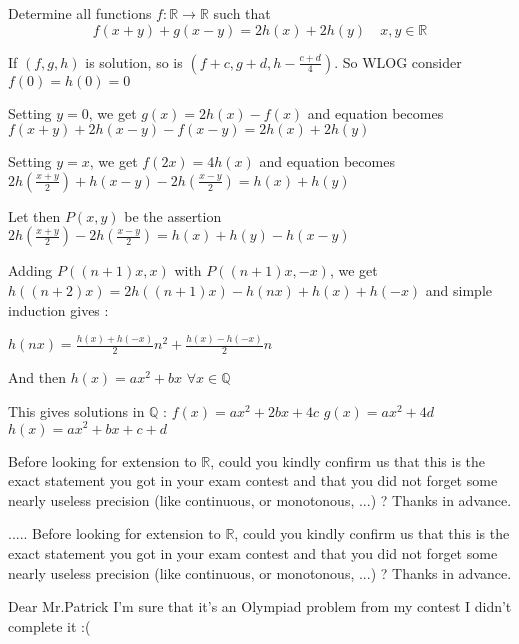 \begin{solution}
	\begin{tcolorbox}Determine all  functions $f: \mathbb {R}\to\mathbb {R}$ such that
\[f(x+y)+g(x-y)=2h(x)+2h(y) \quad x,y\in\mathbb R\]\end{tcolorbox}
If $(f,g,h)$ is solution, so is $(f+c,g+d,h-\frac{c+d}4)$. So WLOG consider $f(0)=h(0)=0$

Setting $y=0$, we get $g(x)=2h(x)-f(x)$ and equation becomes $f(x+y)+2h(x-y)-f(x-y)=2h(x)+2h(y)$

Setting $y=x$, we get $f(2x)=4h(x)$ and equation becomes $2h(\frac{x+y}2)+h(x-y)-2h(\frac{x-y}2)=h(x)+h(y)$

Let then $P(x,y)$ be the assertion $2h(\frac{x+y}2)-2h(\frac{x-y}2)=h(x)+h(y)-h(x-y)$

Adding $P((n+1)x,x)$ with $P((n+1)x,-x)$, we get $h((n+2)x)=2h((n+1)x)-h(nx)+h(x)+h(-x)$ and simple induction gives :

$h(nx)=\frac{h(x)+h(-x)}2n^2+\frac{h(x)-h(-x)}2n$ 

And  then $h(x)=ax^2+bx$ $\forall x\in\mathbb Q$

This gives solutions in $\mathbb Q$ :
$f(x)=ax^2+2bx+4c$
$g(x)=ax^2+4d$
$h(x)=ax^2+bx+c+d$

Before looking for extension to $\mathbb R$, could you kindly confirm us that this is the exact statement you got in your exam \/ contest and that you did not forget some nearly useless precision (like continuous, or monotonous, ...) ?
Thanks in advance.
\end{solution}



\begin{solution}
	\begin{tcolorbox}
.....
Before looking for extension to $\mathbb R$, could you kindly confirm us that this is the exact statement you got in your exam \/ contest and that you did not forget some nearly useless precision (like continuous, or monotonous, ...) ?
Thanks in advance.\end{tcolorbox}
Dear Mr.Patrick
I'm sure that it's an Olympiad problem from my contest
I didn't complete it :(
\end{solution}






